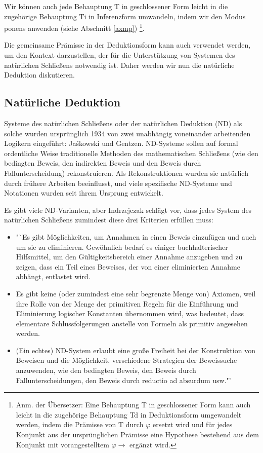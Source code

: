 Wir können auch jede Behauptung T in geschlossener Form leicht in die zugehörige Behauptung Ti in Inferenzform umwandeln, indem wir den Modus ponens anwenden (siehe Abschnitt \ref{axmp}) \footnote{Anm. der Übersetzer: Eine Behauptung T in geschlossener Form kann auch leicht in die zugehörige Behauptung Td in Deduktionsform umgewandelt werden, indem die Prämisse von T durch $\varphi$ ersetzt wird und für jedes Konjunkt aus der ursprünglichen Prämisse eine Hypothese bestehend aus dem Konjunkt mit vorangestelltem  $\varphi \rightarrow $ ergänzt wird.}.

Die gemeinsame Prämisse in der Deduktionsform kann auch verwendet werden, um den Kontext darzustellen, der für die Unterstützung von Systemen des natürlichen Schließens notwendig ist. Daher werden wir nun die natürliche Deduktion diskutieren.

\subsection{Natürliche Deduktion}\label{naturaldeduction}

Systeme des natürlichen Schließens oder der natürlichen Deduktion (ND) als solche wurden ursprünglich 1934 von zwei unabhängig voneinander arbeitenden Logikern eingeführt: Ja\'skowski und Gentzen. ND-Systeme sollen auf formal ordentliche Weise traditionelle Methoden des mathematischen Schließens (wie den bedingten Beweis, den indirekten Beweis und den Beweis durch Fallunterscheidung) rekonstruieren. Als Rekonstruktionen wurden sie natürlich durch frühere Arbeiten beeinflusst, und viele spezifische ND-Systeme und Notationen wurden seit ihrem Ursprung entwickelt.

Es gibt viele ND-Varianten, aber Indrzejczak\cite[S.~31-32]{Indrzejczak} schlägt vor, dass jedes System des natürlichen Schließens zumindest diese drei Kriterien erfüllen muss:

\begin{itemize}
\item "`Es gibt Möglichkeiten, um Annahmen in einen Beweis einzufügen und auch um sie zu eliminieren. Gewöhnlich bedarf es einiger buchhalterischer Hilfsmittel, um den Gültigkeitsbereich einer Annahme anzugeben und zu zeigen, dass ein Teil eines Beweises, der von einer eliminierten Annahme abhängt, entlastet wird.
\item Es gibt keine (oder zumindest eine sehr begrenzte Menge von) Axiomen, weil ihre Rolle von der Menge der primitiven Regeln für die Einführung und Eliminierung logischer Konstanten übernommen wird, was bedeutet, dass elementare Schlussfolgerungen anstelle von Formeln als primitiv angesehen werden.
\item (Ein echtes) ND-System erlaubt eine große Freiheit bei der Konstruktion von Beweisen und die Möglichkeit, verschiedene Strategien der Beweissuche anzuwenden, wie den bedingten Beweis, den Beweis durch Fallunterscheidungen, den Beweis durch reductio ad absurdum usw."'
\end{itemize}

